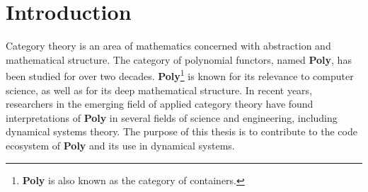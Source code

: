 \chapter{Introduction}
Category theory is an area of mathematics concerned with abstraction and mathematical structure. The category of polynomial functors, named \textbf{Poly}, has been studied for over two decades. \textbf{Poly}\footnote{\textbf{Poly} is also known as the category of containers.} is known for its relevance to computer science, as well as for its deep mathematical structure. In recent years, researchers in the emerging field of applied category theory have found interpretations of \textbf{Poly} in several fields of science and engineering, including dynamical systems theory. The purpose of this thesis is to contribute to the code ecosystem of \textbf{Poly} and its use in dynamical systems.









